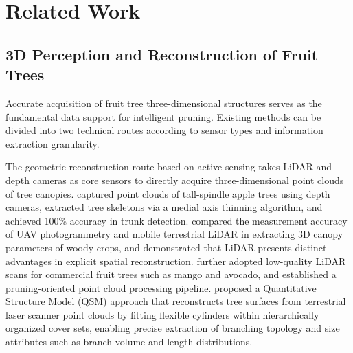 \documentclass[12pt,a4paper,fontset=fandol]{ctexart}
\begin{document}
\section{Related Work}\label{sec:related}

\subsection{3D Perception and Reconstruction of Fruit Trees}

Accurate acquisition of fruit tree three-dimensional structures serves as the fundamental data support for intelligent pruning.
Existing methods can be divided into two technical routes according to sensor types and information extraction granularity.

The geometric reconstruction route based on active sensing takes LiDAR and depth cameras as core sensors to directly acquire three-dimensional point clouds of tree canopies.
\citet{karkee2014identification} captured point clouds of tall-spindle apple trees using depth cameras, extracted tree skeletons via a medial axis thinning algorithm, and achieved 100\% accuracy in trunk detection.
\citet{torres2023mtls} compared the measurement accuracy of UAV photogrammetry and mobile terrestrial LiDAR in extracting 3D canopy parameters of woody crops, and demonstrated that LiDAR presents distinct advantages in explicit spatial reconstruction.
\citet{westling2021procedure} further adopted low-quality LiDAR scans for commercial fruit trees such as mango and avocado, and established a pruning-oriented point cloud processing pipeline.
\citet{raumonen2013automatic} proposed a Quantitative Structure Model (QSM) approach that reconstructs tree surfaces from terrestrial laser scanner point clouds by fitting flexible cylinders within hierarchically organized cover sets, enabling precise extraction of branching topology and size attributes such as branch volume and length distributions.
\end{document}
